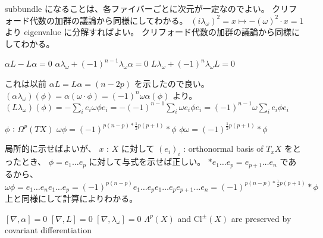 \begin{Proof}
\itemprof
  subbundle になることは、各ファイバーごとに次元が一定なのでよい。
  クリフォード代数の加群の議論から同様にしてわかる。
\itemprof
  \((i \lambda_{\omega})^2 = x \mapsto - (\omega)^2 \cdot x = 1\) より eigenvalue に分解すればよい。
\itemprof
  クリフォード代数の加群の議論から同様にしてわかる。
\end{Proof}

\begin{Theorem}
\itemprop
  \(\alpha L - L \alpha = 0\)
\itemprop
  \(\alpha \lambda_{\omega} + (-1)^{n-1}\lambda_{\omega} \alpha = 0\)
\itemprop
  \(L \lambda_{\omega} + (-1)^n \lambda_{\omega} L = 0\)
\end{Theorem}

\begin{Proof}
\itemprof
  これは以前 \(\alpha L = L \alpha = (n -2p)\) を示したので良い。
\itemprof
  \((\alpha \lambda_{\omega})(\phi) = \alpha (\omega \cdot \phi) = (-1)^n \omega \alpha(\phi)\) より。
\itemprof
  \((L \lambda_{\omega})(\phi) = - \sum_i e_i \omega \phi e_i = - (-1)^{n-1}\sum_i \omega e_i \phi e_i = (-1)^{n-1} \omega \sum_i e_i \phi e_i\)
\end{Proof}

\begin{Theorem}
\itemwhen
  \Fix \(\phi\) : \(\Omega^p(TX)\)
\itemprop
  \(\omega \phi = (-1)^{p(n-p) * \frac{1}{2}p(p+1)} *\phi\)
\itemprop
  \(\phi \omega = (-1)^{\frac{1}{2}p(p+1)}*\phi\)
\end{Theorem}

\begin{Proof}
\itemprof
  局所的に示せばよいが、
  \(x\) : \(X\) に対して \((e_i)_i\) : orthonormal basis of \(T_xX\) をとったとき、 \(\phi = e_1 \ldots e_p\) に対して与式を示せば正しい。
  \(* e_1 \ldots e_p = e_{p+1} \ldots e_n\) であるから、
  \[\omega \phi = e_1 \ldots e_n e_1 \ldots e_p =(-1)^{p(n-p)} e_1 \ldots e_p e_1 \ldots e_p e_{p+1} \ldots e_n = (-1)^{p(n-p) * \frac{1}{2}p(p+1)} * \phi\]
\itemprop
  上と同様にして計算によりわかる。
\end{Proof}

\begin{Theorem}
\itemprop
  \([\nabla , \alpha] = 0\)
\itemprop
  \([\nabla , L] = 0\)
\itemprop
  \([\nabla , \lambda_{\omega}] = 0\)
\itemprop
  \(\Lambda^p(X)\) and \(\text{Cl}^{\pm}(X)\) are preserved by covariant differentiation
\end{Theorem}

